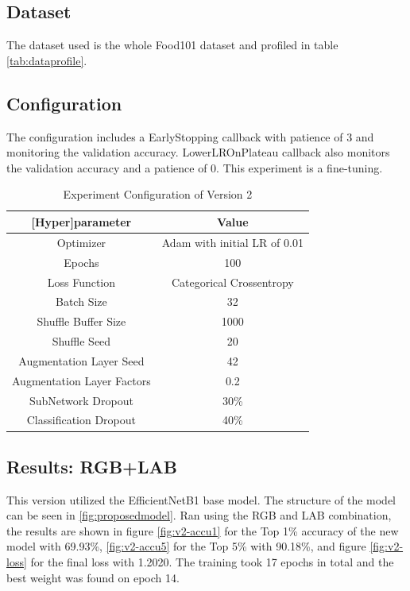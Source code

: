 \subsection{Dataset}
The dataset used is the whole Food101 dataset \cite{bossard-2014} and profiled in table \ref{tab:dataprofile}. 

\subsection{Configuration}
The configuration includes a EarlyStopping callback with patience of 3 and monitoring the validation accuracy. LowerLROnPlateau callback also monitors the validation accuracy and a patience of 0. This experiment is a fine-tuning.

\begin{table}[htbp]
  \centering
  \begin{tabular}{|c|c|}
    \hline
    \textbf{[Hyper]parameter} & \textbf{Value} \\
    \hline
    Optimizer & Adam with initial LR of 0.01 \\
    Epochs & 100 \\
    Loss Function & Categorical Crossentropy \\
    Batch Size & 32 \\
    Shuffle Buffer Size & 1000 \\
    Shuffle Seed & 20 \\
    Augmentation Layer Seed & 42 \\
    Augmentation Layer Factors & 0.2 \\
    SubNetwork Dropout & 30\% \\
    Classification Dropout & 40\% \\
    \hline
  \end{tabular}
  \caption{Experiment Configuration of Version 2}
  \label{tab:config-v2}
\end{table}
\subsection{Results: RGB+LAB}
This version utilized the EfficientNetB1 base model. The structure of the model can be seen in \ref{fig:proposedmodel}. Ran using the RGB and LAB combination, the results are shown in figure \ref{fig:v2-accu1} for the Top 1\% accuracy of the new model with 69.93\%, \ref{fig:v2-accu5} for the Top 5\% with 90.18\%, and figure \ref{fig:v2-loss} for the final loss with 1.2020. The training took 17 epochs in total and the best weight was found on epoch 14.

